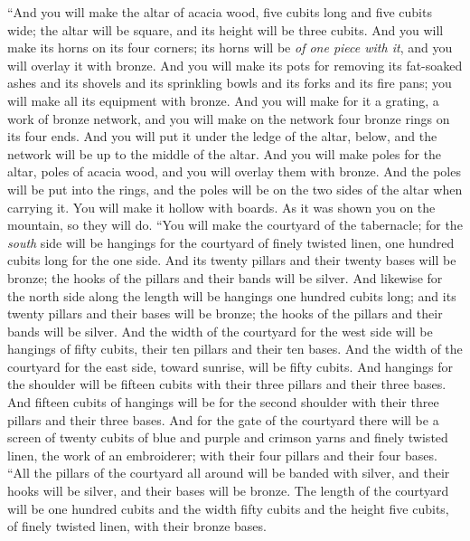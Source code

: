 \begin{biblechapter} %
 “And you will make the altar of acacia wood, five cubits long and five cubits wide; the altar will be square, and its height will be three cubits.
\verse And you will make its horns on its four corners; its horns will be \textit{of one piece with it}, and you will overlay it with bronze.
\verse And you will make its pots for removing its fat-soaked ashes and its shovels and its sprinkling bowls and its forks and its fire pans; you will make all its equipment with bronze.
\verse And you will make for it a grating, a work of bronze network, and you will make on the network four bronze rings on its four ends.
\verse And you will put it under the ledge of the altar, below, and the network will be up to the middle of the altar.
\verse And you will make poles for the altar, poles of acacia wood, and you will overlay them with bronze.
\verse And the poles will be put into the rings, and the poles will be on the two sides of the altar when carrying it.
\verse You will make it hollow with boards. As it was shown you on the mountain, so they will do.
 “You will make the courtyard of the tabernacle; for the \textit{south} side will be hangings for the courtyard of finely twisted linen, one hundred cubits long for the one side.
\verse And its twenty pillars and their twenty bases will be bronze; the hooks of the pillars and their bands will be silver.
\verse And likewise for the north side along the length will be hangings one hundred cubits long; and its twenty pillars and their bases will be bronze; the hooks of the pillars and their bands will be silver.
\verse And the width of the courtyard for the west side will be hangings of fifty cubits, their ten pillars and their ten bases.
\verse And the width of the courtyard for the east side, toward sunrise, will be fifty cubits.
\verse And hangings for the shoulder will be fifteen cubits with their three pillars and their three bases.
\verse And fifteen cubits of hangings will be for the second shoulder with their three pillars and their three bases.
\verse And for the gate of the courtyard there will be a screen of twenty cubits of blue and purple and crimson yarns and finely twisted linen, the work of an embroiderer; with their four pillars and their four bases.
\verse “All the pillars of the courtyard all around will be banded with silver, and their hooks will be silver, and their bases will be bronze.
\verse The length of the courtyard will be one hundred cubits and the width fifty cubits and the height five cubits, of finely twisted linen, with their bronze bases.

\end{biblechapter}
